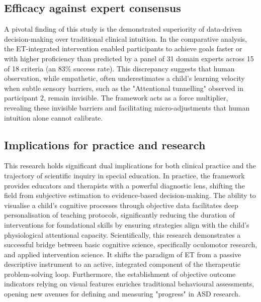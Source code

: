 \subsection{Efficacy against expert consensus}
A pivotal finding of this study is the demonstrated superiority of data-driven decision-making over traditional clinical intuition. In the comparative analysis, the ET-integrated intervention enabled participants to achieve goals faster or with higher proficiency than predicted by a panel of 31 domain experts across 15 of 18 criteria (an 83\% success rate). This discrepancy suggests that human observation, while empathetic, often underestimates a child's learning velocity when subtle sensory barriers, such as the "Attentional tunnelling" observed in participant 2, remain invisible. The framework acts as a force multiplier, revealing these invisible barriers and facilitating micro-adjustments that human intuition alone cannot calibrate.

\subsection{Implications for practice and research}
This research holds significant dual implications for both clinical practice and the trajectory of scientific inquiry in special education. In practice, the framework provides educators and therapists with a powerful diagnostic lens, shifting the field from subjective estimation to evidence-based decision-making. The ability to visualise a child’s cognitive processes through objective data facilitates deep personalisation of teaching protocols, significantly reducing the duration of interventions for foundational skills by ensuring strategies align with the child's physiological attentional capacity. Scientifically, this research demonstrates a successful bridge between basic cognitive science, specifically oculomotor research, and applied intervention science. It shifts the paradigm of ET from a passive descriptive instrument to an active, integrated component of the therapeutic problem-solving loop. Furthermore, the establishment of objective outcome indicators relying on visual features enriches traditional behavioural assessments, opening new avenues for defining and measuring "progress" in ASD research.

